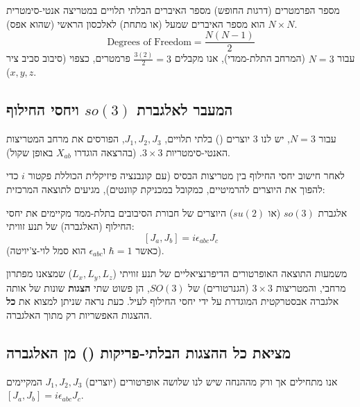 \begin{notebox}{מספר הפרמטרים (דרגות החופש)}
מספר האיברים הבלתי תלויים במטריצה אנטי-סימטרית $N \times N$ הוא מספר האיברים שמעל (או מתחת) לאלכסון הראשי (שהוא אפס).
$$ \text{Degrees of Freedom} = \frac{N(N-1)}{2} $$
עבור $N=3$ (המרחב התלת-ממדי), אנו מקבלים $\frac{3(2)}{2} = 3$ פרמטרים, כצפוי (סיבוב סביב ציר $x, y, z$).
\end{notebox}

\subsection*{המעבר לאלגברת $so(3)$ ויחסי החילוף}
עבור $N=3$, יש לנו 3 יוצרים () בלתי תלויים, $J_1, J_2, J_3$, הפורסים את מרחב המטריצות האנטי-סימטריות $3 \times 3$.
(בהרצאה הוגדרו $X_{ab}$ באופן שקול).

לאחר חישוב יחסי החילוף בין מטריצות הבסיס (עם קונבנציה פיזיקלית הכוללת פקטור $i$ כדי להפוך את היוצרים להרמיטיים, כמקובל במכניקת קוונטים), מגיעים לתוצאה המרכזית:

\begin{formulabox}{אלגברת $so(3)$ (או $su(2)$)}
היוצרים של חבורת הסיבובים בתלת-ממד מקיימים את יחסי החילוף (האלגברה) של תנע זוויתי:
$$ [J_a, J_b] = i \epsilon_{abc} J_c $$
(כאשר $\hbar=1$ ו$\epsilon_{abc}$ הוא סמל לוי-צ'יויטה).
\end{formulabox}

\begin{importantbox}{משמעות התוצאה}
האופרטורים הדיפרנציאליים של תנע זוויתי ($L_x, L_y, L_z$) שמצאנו מפתרון מרחבי, והמטריצות $3 \times 3$ (הגנרטורים) של $SO(3)$, הן פשוט שתי \textbf{הצגות} שונות של אותה אלגברה אבסטרקטית המוגדרת על ידי יחסי החילוף לעיל.
כעת נראה שניתן למצוא את \textbf{כל} ההצגות האפשריות רק מתוך האלגברה.
\end{importantbox}

\subsection*{מציאת כל ההצגות הבלתי-פריקות () מן האלגברה}
אנו מתחילים אך ורק מההנחה שיש לנו שלושה אופרטורים (יוצרים) $J_1, J_2, J_3$ המקיימים $[J_a, J_b] = i \epsilon_{abc} J_c$.


